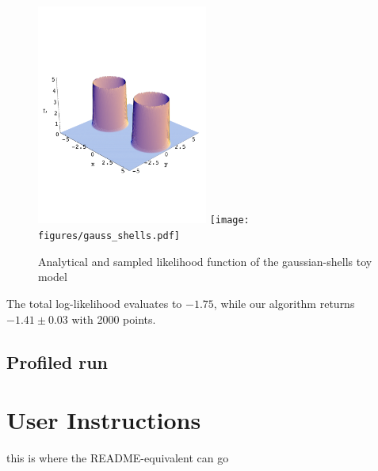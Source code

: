 \documentclass{article}
\begin{document}
\begin{figure}\label{gauss-shell}
\includegraphics[width=0.5\textwidth]{figures/gauss_shells_analytic.pdf}
\texttt{[image: figures/gauss\_shells.pdf]}
\caption{Analytical and sampled likelihood function of the gaussian-shells toy model}
\end{figure}

The total log-likelihood evaluates to $-1.75$, while our algorithm returns $-1.41\pm 0.03$  with 2000 points.

\subsection{Profiled run}
\section{User Instructions}
this is where the README-equivalent can go


\end{document}
